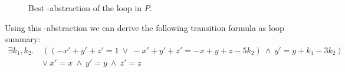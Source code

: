 \begin{center}
	\begin{figure}[H]
		
		\caption{Best \qvasr-abstraction of the loop in $P$.}
		\label{vasr}
	\end{figure}
\end{center}
Using this \qvasr-abstraction we can derive the following transition formula as loop summary:
\begin{align*}
	\exists k_1, k_2.\ &((-x' + y' + z' = 1\ \lor\ -x' + y' + z' = -x + y + z - 5k_2)\ \land\ y' = y + k_1 - 3k_2)\ \\ &\lor\ x' = x\ \land\ y' = y\ \land\ z' = z
\end{align*}
